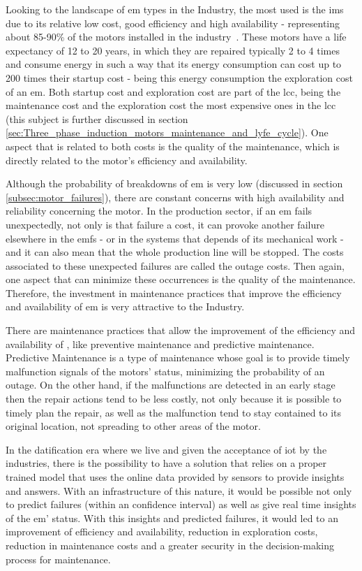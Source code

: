 Looking to the landscape of \acrlong{em} types in the Industry, the most used is the \acrfull{ims} due to its relative low cost, good efficiency and high availability - representing about 85-90\% of the motors installed in the industry~\cite{Ferreira1}. 
These motors have a life expectancy of 12 to 20 years, in which they are repaired typically 2 to 4 times and consume energy in such a way that its energy consumption can cost up to 200 times their startup cost - being this energy consumption the exploration cost of an \acrlong{em}. 
Both startup cost and exploration cost are part of the \acrfull{lcc}, being the maintenance cost and the exploration cost the most expensive ones in the \acrshort{lcc} ~\cite{Ferreira1} (this subject is further discussed in section \ref{sec:Three_phase_induction_motors_maintenance_and_lyfe_cycle}). One aspect that is related to both costs is the quality of the maintenance, which is directly related to the motor's efficiency and availability. 

Although the probability of breakdowns of \acrlong{em} is very low (discussed in section \ref{subsec:motor_failures}), there are constant concerns with high availability and reliability concerning the motor.
In the production sector, if an \acrlong{em} fails unexpectedly, not only is that failure a cost, it can provoke another failure elsewhere in the  \acrshort{emfs} - or in the systems that depends of its mechanical work - and it can also mean that the whole production line will be stopped. The costs associated to these unexpected failures are called the outage costs. Then again, one aspect that can minimize these occurrences is the quality of the maintenance. Therefore, the investment in maintenance practices that improve the efficiency and availability of \acrlong{em} is very attractive to the Industry.

There are maintenance practices that allow the improvement of the efficiency and availability of , like preventive maintenance and predictive maintenance. 
Predictive Maintenance is a type of maintenance whose goal is to provide timely malfunction signals of the motors' status, minimizing the probability of an outage.  
On the other hand, if the malfunctions are detected in an early stage then the repair actions tend to be less costly, not only because it is possible to timely plan the repair, as well as the malfunction tend to stay contained to its original location, not spreading to other areas of the motor.


In the datification era where we live and given the acceptance of \acrfull{iot} by the industries, there is the possibility to have a solution that relies on a proper trained model that uses the online data provided by sensors to provide insights and answers. 
With an infrastructure of this nature, it would be possible not only to predict failures (within an confidence interval) as well as give real time insights of the \acrlong{em}' status. With this insights and predicted failures, it would led to an improvement of efficiency and availability, reduction in exploration costs, reduction in maintenance costs and a greater security in the decision-making process for maintenance.

